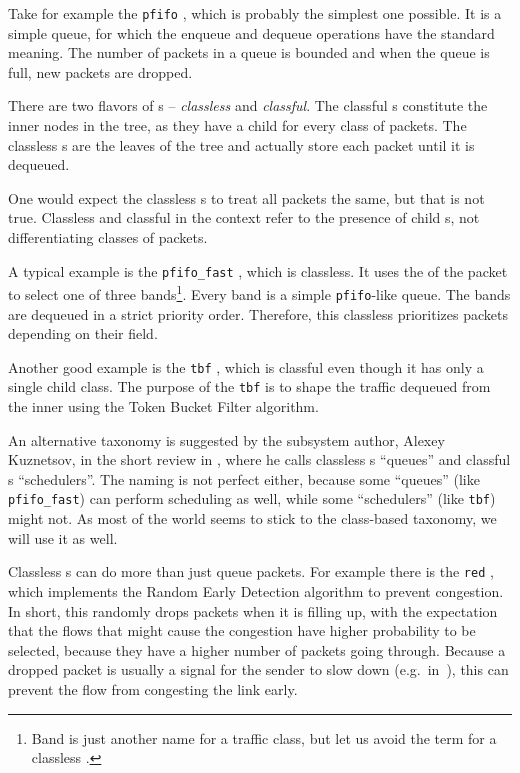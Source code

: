 Take for example the \texttt{pfifo} \qdisc{}, which is probably the simplest
one possible. It is a simple  queue, for which the enqueue and dequeue
operations have the standard meaning. The number of packets in a queue is
bounded and when the queue is full, new packets are dropped.

There are two flavors of \qdisc{}s -- \emph{classless} and \emph{classful}.
The classful \qdisc{}s constitute the inner nodes in the \qdisc{} tree, as they
have a child \qdisc{} for every class of packets. The classless \qdisc{}s
are the leaves of the tree and actually store each packet
until it is dequeued.

One would expect the classless \qdisc{}s to treat all packets the same,
but that is not true. Classless and classful in the  context refer
to the presence of child \qdisc{}s, not differentiating classes of packets.

A typical example is the \texttt{pfifo\_fast} \qdisc, which is classless. It
uses the  of the packet to select one of three bands\footnote{Band is
just another name for a traffic class, but let us avoid the term for a classless
\qdisc.}. Every band is a simple \texttt{pfifo}-like queue. The bands are
dequeued in a strict priority order. Therefore, this classless \qdisc{}
prioritizes packets depending on their  field.

Another good example is the \texttt{tbf} \qdisc{}, which is classful even though
it has only a single child class. The purpose of the \texttt{tbf} \qdisc{} is to shape the
traffic dequeued from the inner \qdisc{} using the Token Bucket Filter algorithm.

An alternative \qdisc{} taxonomy is suggested by the subsystem author, Alexey
Kuznetsov, in the short review in , where he
calls classless \qdisc{}s ``queues'' and classful \qdisc{}s
``schedulers''. The naming is not perfect either, because some ``queues'' (like
\texttt{pfifo\_fast}) can perform scheduling as well, while some ``schedulers''
(like \texttt{tbf}) might not. As most of the world seems to stick to the
class-based taxonomy, we will use it as well.

Classless \qdisc{}s can do more than just queue packets. For example there is the
\texttt{red} \qdisc{}, which implements the Random Early Detection algorithm to
prevent congestion. In short, this \qdisc{} randomly drops packets when it is
filling up, with the expectation that the flows that might cause the congestion
have higher probability to be selected, because they have a higher number of
packets going through. Because a dropped packet is usually a signal for the sender to
slow down (e.g.~in~), this can prevent the flow from congesting the link
early.

